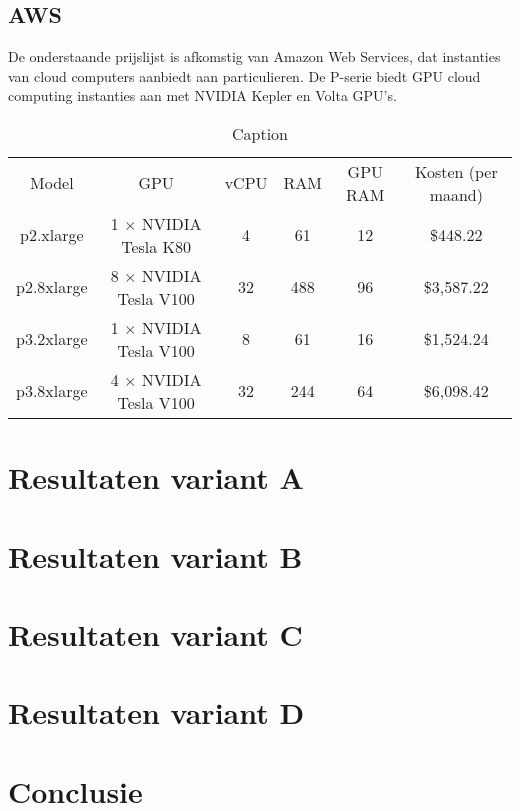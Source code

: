 \subsection{AWS}
De onderstaande prijslijst is afkomstig van Amazon Web Services, dat instanties van cloud computers aanbiedt aan particulieren. De P-serie biedt GPU cloud computing instanties aan met NVIDIA Kepler en Volta GPU's.

\begin{table}[H]
    \centering
    \begin{tabular}{c|c|c|c|c|c}
        Model & GPU & vCPU & RAM & GPU RAM & Kosten (per maand) \\
        p2.xlarge & 1 $\times$ NVIDIA Tesla K80 & 4 & 61 & 12 & \$448.22  \\
        p2.8xlarge & 8 $\times$ NVIDIA Tesla V100 & 32 & 488 & 96 & \$3,587.22  \\
        p3.2xlarge & 1 $\times$ NVIDIA Tesla V100 & 8 & 61 & 16 & \$1,524.24 \\
        p3.8xlarge & 4 $\times$ NVIDIA Tesla V100 & 32 & 244 & 64 & \$6,098.42  \\
    \end{tabular}
    \caption{Caption}
    \label{tab:my_label}
\end{table}




\section{Resultaten variant A}

\section{Resultaten variant B}

\section{Resultaten variant C}

\section{Resultaten variant D}


\section{Conclusie}
